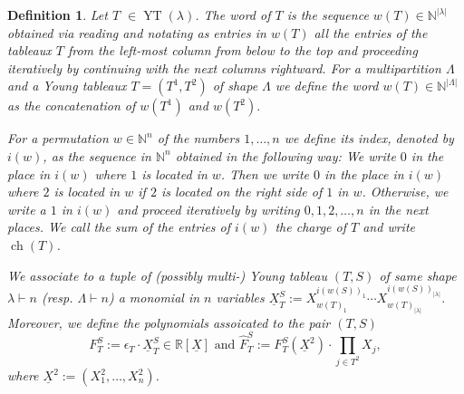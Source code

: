 \documentclass[11pt,a4paper]{amsart}
\numberwithin{equation}{section}
\newtheorem{definition}[thm]{Definition}
\theoremstyle{definition}
\newcommand{\N}{\mathbb{N}}
\newcommand{\R}{\mathbb{R}}
\DeclareMathOperator{\ch}{ch}
\DeclareMathOperator{\YT}{YT}
\numberwithin{thm}{section}
\theoremstyle{break}
\numberwithin{subcase}{case}
\begin{document}
 \begin{definition}
 Let $T$ $\in \YT (\lambda)$. The word of $T$ is the sequence $w(T) \in \N^
{|\lambda|}$ obtained via reading and notating as entries in $w(T)$ all the entries of the tableaux $T$ from the left-most column from below to the top and proceeding iteratively by continuing with the next columns rightward. For a multipartition $\Lambda$ and a Young tableaux $T=(T^1,T^2)$ of shape $\Lambda$ we define the word $w(T) \in \N^{|\Lambda|}$ as the concatenation of $w(T^1)$ and $w(T^2).$

For a permutation $w \in \N^n$ of the numbers $1,\ldots,n$ we define its index, denoted by $i(w)$, as the sequence in $\N^n$ obtained in the following way: We write $0$ in the place in $i(w)$ where $1$ is located in $w$. Then we write $0$ in the place in $i(w)$ where $2$ is located in $w$ if $2$ is located on the right side of $1$ in $w$. Otherwise, we write a $1$ in $i(w)$ and proceed iteratively by writing $0,1,2,\ldots,n$ in the next places. We call the sum of the entries of $i(w)$ the charge of $T$ and write $\ch (T)$.

We associate to a tuple of (possibly multi-) Young tableau $(T,S)$ of same shape $\lambda \vdash n$ (resp. $\Lambda \vdash n$) a monomial in $n$ variables $\underline{X}_T^S := X_{w(T)_1}^{i(w(S))_1} \cdots X_{w(T)_{|\lambda|}}^{i(w(S))_{|\lambda|}}.$ Moreover, we define the polynomials assoicated to the pair $(T,S)$ $$F_{T}^S := \epsilon_T \cdot \underline{X}_{T}^{S} \in \R[\underline{X}] \mbox{ and } \widehat{F}_T^S:= F_{T}^S(\underline{X}^2) \cdot \prod_{j \in T^2} X_j,$$ where $\underline{X}^2:=(X_1^2,\ldots,X_n^2)$.
\end{definition}
 
\end{document}

